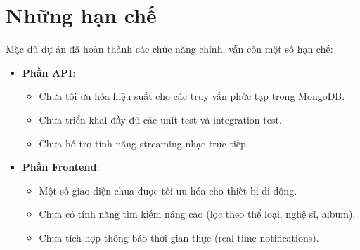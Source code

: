 \section{Những hạn chế}
Mặc dù dự án đã hoàn thành các chức năng chính, vẫn còn một số hạn chế:
\begin{itemize}
    \item \textbf{Phần API}:
    \begin{itemize}
        \item Chưa tối ưu hóa hiệu suất cho các truy vấn phức tạp trong MongoDB.
        \item Chưa triển khai đầy đủ các unit test và integration test.
        \item Chưa hỗ trợ tính năng streaming nhạc trực tiếp.
    \end{itemize}
    \item \textbf{Phần Frontend}:
    \begin{itemize}
        \item Một số giao diện chưa được tối ưu hóa cho thiết bị di động.
        \item Chưa có tính năng tìm kiếm nâng cao (lọc theo thể loại, nghệ sĩ, album).
        \item Chưa tích hợp thông báo thời gian thực (real-time notifications).
    \end{itemize}
\end{itemize}

